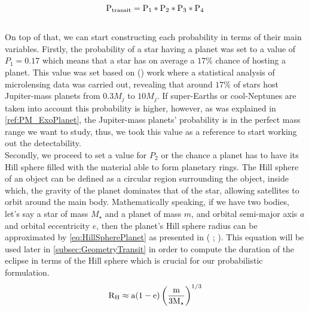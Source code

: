 \begingroup
\Large
\begin{equation}
 \textnormal{P}_{\textnormal{transit}} = \textnormal{P}_1 * \textnormal{P}_2 * \textnormal{P}_3 * \textnormal{P}_4
 \label{eq:Probabilities}
\end{equation}
\endgroup\\

On top of that, we can start constructing each probability in terms of their main variables. Firstly, the probability of a star having a planet was set to a value of $P_1 = 0.17$ which means that a star has on average a $17\%$ chance of hosting a planet. This value was set based on  (\citeyear{2012Natur.481..167C}) work where a statistical analysis of microlensing data was carried out, revealing that around $17\%$ of stars host Jupiter-mass planets from $0.3M_j$ to $10M_j$. If super-Earths or cool-Neptunes are taken into account this probability is higher, however, as was explained in \autoref{ref:PM_ExoPlanet}, the Jupiter-mass planets' probability is in the perfect mass range we want to study, thus, we took this value as a reference to start working out the detectability.\\

Secondly, we proceed to set a value for $P_2$ or the chance a planet has to have its Hill sphere filled with the material able to form planetary rings. The Hill sphere of an object can be defined as a circular region surrounding the object, inside which, the gravity of the planet dominates that of the star, allowing satellites to orbit around the main body. Mathematically speaking, if we have two bodies, let's say a star of mass $M_\star$ and a planet of mass $m$, and orbital semi-major axis $a$ and orbital eccentricity $e$, then the planet's Hill sphere radius can be approximated by \autoref{eq:HillSpherePlanet} as presented in ( \citeyear{2017MNRAS.471..740O};  \citeyear{2016A&A...596A...9R}). This equation will be used later in \autoref{subsec:GeometryTransit} in order to compute the duration of the eclipse in terms of the Hill sphere which is crucial for our probabilistic formulation.\\ 

\begingroup
\Large
\begin{equation}
\textnormal{R}_\textnormal{H} \approx \textnormal{a}(1 - \textnormal{e}) \left(\frac{\textnormal{m}}{3\textnormal{M}_\star} \right)^{1/3}
 \label{eq:HillSpherePlanet}
\end{equation}
\endgroup\\

